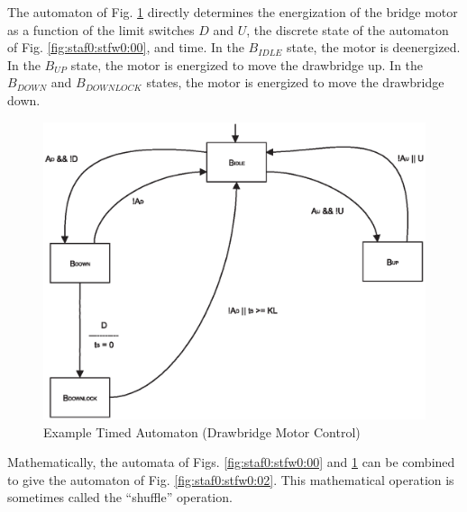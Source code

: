 \documentclass[letterpaper,10pt,titlepage]{article}
\begin{document}
The automaton of Fig. \ref{fig:staf0:stfw0:01} directly
determines the energization of the bridge motor as a function of 
the limit switches $D$ and $U$, the discrete state of the automaton
of Fig. \ref{fig:staf0:stfw0:00}, and time.
In the $B_{IDLE}$ state, the motor is deenergized.
In the $B_{UP}$ state, the motor is energized to move the
drawbridge up.  In the $B_{DOWN}$ and $B_{DOWNLOCK}$ states,
the motor is energized to move the drawbridge down.

\begin{figure}
\centering
\includegraphics[width=4.6in]{exta02.eps}
\caption{Example Timed Automaton (Drawbridge Motor Control)}
\label{fig:staf0:stfw0:01}
\end{figure}

Mathematically, the automata of Figs. 
\ref{fig:staf0:stfw0:00}
and
\ref{fig:staf0:stfw0:01} can be combined to give the automaton of
Fig. \ref{fig:staf0:stfw0:02}\@.  This mathematical operation is sometimes called the
``shuffle'' operation.
\end{document}
